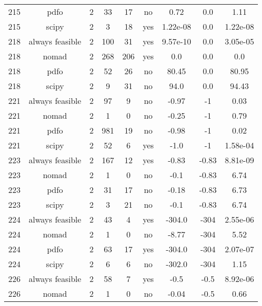 \begin{scriptsize}
\begin{center}
\begin{longtable}{ccccccccc}
215 &            pdfo &  2 &     33 &     17 &      no &        0.72 &         0.0 &     1.11\\
215 &           scipy &  2 &      3 &     18 &     yes &    1.22e-08 &         0.0 & 1.22e-08\\
218 & always feasible &  2 &    100 &     31 &     yes &    9.57e-10 &         0.0 & 3.05e-05\\
218 &           nomad &  2 &    268 &    206 &     yes &         0.0 &         0.0 &      0.0\\
218 &            pdfo &  2 &     52 &     26 &      no &       80.45 &         0.0 &    80.95\\
218 &           scipy &  2 &      9 &     31 &      no &        94.0 &         0.0 &    94.43\\
221 & always feasible &  2 &     97 &      9 &      no &       -0.97 &          -1 &     0.03\\
221 &           nomad &  2 &      1 &      0 &      no &       -0.25 &          -1 &     0.79\\
221 &            pdfo &  2 &    981 &     19 &      no &       -0.98 &          -1 &     0.02\\
221 &           scipy &  2 &     52 &      6 &     yes &        -1.0 &          -1 & 1.58e-04\\
223 & always feasible &  2 &    167 &     12 &     yes &       -0.83 &       -0.83 & 8.81e-09\\
223 &           nomad &  2 &      1 &      0 &      no &        -0.1 &       -0.83 &     6.74\\
223 &            pdfo &  2 &     31 &     17 &      no &       -0.18 &       -0.83 &     6.73\\
223 &           scipy &  2 &      3 &     21 &      no &        -0.1 &       -0.83 &     6.74\\
224 & always feasible &  2 &     43 &      4 &     yes &      -304.0 &        -304 & 2.55e-06\\
224 &           nomad &  2 &      1 &      0 &      no &       -8.77 &        -304 &     5.52\\
224 &            pdfo &  2 &     63 &     17 &     yes &      -304.0 &        -304 & 2.07e-07\\
224 &           scipy &  2 &      6 &      6 &      no &      -302.0 &        -304 &     1.15\\
226 & always feasible &  2 &     58 &      7 &     yes &        -0.5 &        -0.5 & 8.92e-06\\
226 &           nomad &  2 &      1 &      0 &      no &       -0.04 &        -0.5 &     0.66\\

\end{longtable}
\end{center}
\end{scriptsize}

